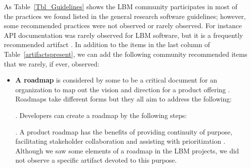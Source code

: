 \documentclass[final, 3p, times, authoryear]{elsarticle}
\begin{document}
As Table~\ref{Tbl_Guidelines} shows the LBM community participates in most of
the practices we found listed in the general research software guidelines;
however, some recommended practices were not observed or rarely observed. For
instance API documentation was rarely observed for LBM software, but it is a
frequently recommended artifact \citep{SmithAndRoscoe2018, ThielEtAl2020,
vanGompelEtAl2016, OrvizEtAl2017, SSI2022, Zadka2018}.  In addition to the items
in the last column of Table~\ref{artifactspresent}, we can add the following
community recommended items that we rarely, if ever, observed:

\begin{itemize}

\item \textbf{A roadmap} is considered by some to be a critical document for an
organization to map out the vision and direction for a product offering
\citep{MunchEtAl2019}.  Roadmaps take different forms but they all aim to
address the following:  \citep{PhaalEtAl2005}.
Developers can create a roadmap by the following steps:
 \citep{VahaniittyEtAl2002}.  A product
roadmap has the benefits of providing continuity of purpose, facilitating
stakeholder collaboration and assisting with prioritization \citep{Pichler2012}.
Although we saw some elements of a roadmap in the LBM projects, we did not
observe a specific artifact devoted to this purpose.


\end{itemize}
\end{document}

